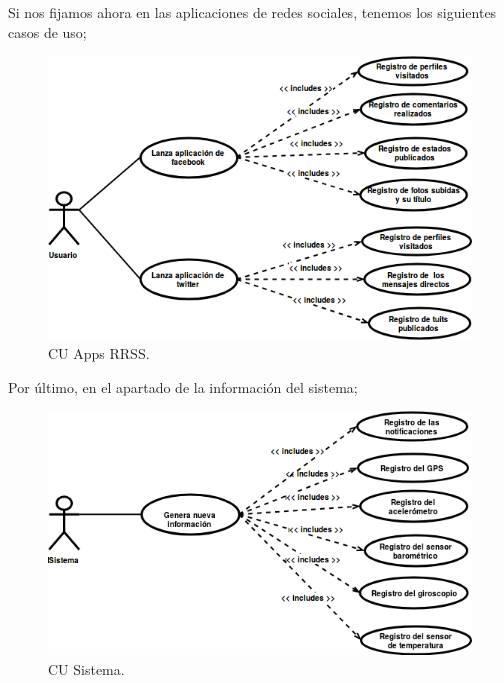 \documentclass[12pt,a4paper,oneside]{book} %
\begin{document}
Si nos fijamos ahora en las aplicaciones de redes sociales, tenemos los siguientes casos de uso; 
\begin{figure}[H]
	\begin{center}
		\includegraphics[scale=0.70]{pictures/usecases/usecases05.png} %
	\end{center}
	\caption[Casos de uso 05]{CU Apps RRSS.}
\end{figure}
Por último, en el apartado de la información del sistema; 
\begin{figure}[H]
	\begin{center}
		\includegraphics[scale=0.70]{pictures/usecases/usecases06.png} %
	\end{center}
	\caption[Casos de uso 06]{CU Sistema.}
\end{figure}
\pagebreak
\end{document}
